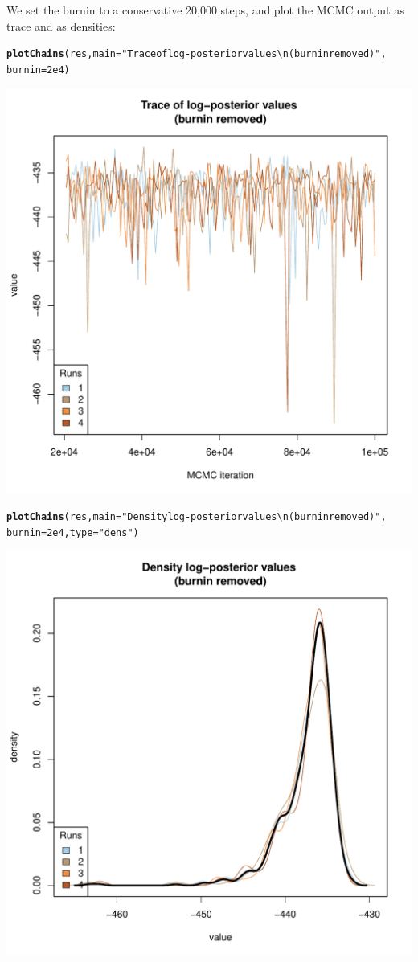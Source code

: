 \documentclass{article}\usepackage[]{graphicx}\usepackage[]{color}
\makeatletter
\newcommand{\hlnum}[1]{\textcolor[rgb]{0.686,0.059,0.569}{#1}}%
\newcommand{\hlstr}[1]{\textcolor[rgb]{0.192,0.494,0.8}{#1}}%
\newcommand{\hlstd}[1]{\textcolor[rgb]{0.345,0.345,0.345}{#1}}%
\newcommand{\hlkwc}[1]{\textcolor[rgb]{0.333,0.667,0.333}{#1}}%
\newcommand{\hlkwd}[1]{\textcolor[rgb]{0.737,0.353,0.396}{\textbf{#1}}}%
\newenvironment{kframe}{%
 \def\at@end@of@kframe{}%
 \ifinner\ifhmode%
  \def\at@end@of@kframe{\end{minipage}}%
  \begin{minipage}{\columnwidth}%
 \fi\fi%
 \def\FrameCommand##1{\hskip\@totalleftmargin \hskip-\fboxsep
 \colorbox{shadecolor}{##1}\hskip-\fboxsep
     \hskip-\linewidth \hskip-\@totalleftmargin \hskip\columnwidth}%
 \MakeFramed {\advance\hsize-\width
   \@totalleftmargin\z@ \linewidth\hsize
   \@setminipage}}%
 {\par\unskip\endMakeFramed%
 \at@end@of@kframe}
\newenvironment{knitrout}{}{} %
\makeatother
\begin{document}
\noindent We set the burnin to a conservative 20,000 steps, and plot the MCMC output as trace and as densities:
\begin{knitrout}
\color{fgcolor}\begin{kframe}
\begin{alltt}
\hlkwd{plotChains}\hlstd{(res,} \hlkwc{main}\hlstd{=}\hlstr{"Trace of log-posterior values \textbackslash{}n(burnin removed)"}\hlstd{,}
           \hlkwc{burnin}\hlstd{=}\hlnum{2e4}\hlstd{)}
\end{alltt}
\end{kframe}

{\centering \includegraphics[width=.6\textwidth]{figs/unnamed-chunk-111} 

}


\begin{kframe}\begin{alltt}
\hlkwd{plotChains}\hlstd{(res,} \hlkwc{main}\hlstd{=}\hlstr{"Density log-posterior values \textbackslash{}n(burnin removed)"}\hlstd{,}
           \hlkwc{burnin}\hlstd{=}\hlnum{2e4}\hlstd{,} \hlkwc{type}\hlstd{=}\hlstr{"dens"}\hlstd{)}
\end{alltt}
\end{kframe}

{\centering \includegraphics[width=.6\textwidth]{figs/unnamed-chunk-112} 

}



\end{knitrout}
\end{document}
